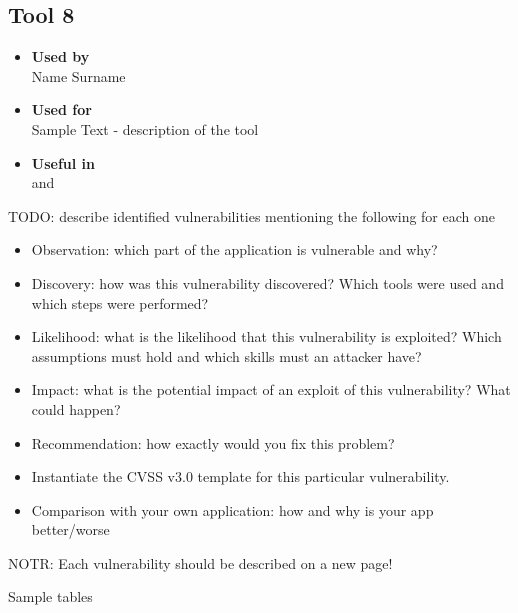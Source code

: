 \subsection*{Tool 8}
\begin{itemize}
	\item \textbf{Used by}\\ Name Surname
	\item \textbf{Used for}\\ Sample Text - description of the tool
	\item \textbf{Useful in}\\  and 
\end{itemize}

\clearpage

TODO:\newline
describe identified vulnerabilities mentioning the following for each one
\begin{itemize}
	\item Observation: which part of the application is vulnerable and why?
	\item Discovery: how was this vulnerability discovered? Which tools were used and which steps were performed?
	\item Likelihood: what is the likelihood that this vulnerability is exploited? Which assumptions must hold and which skills must an attacker have?
	\item Impact: what is the potential impact of an exploit of this vulnerability? What could happen?
	\item Recommendation: how exactly would you fix this problem?
	\item Instantiate the CVSS v3.0 template for this particular vulnerability.
	\item Comparison with your own application: how and why is your app better/worse
\end{itemize}

NOTR: Each vulnerability should be described on a new page!\newline

\clearpage
Sample tables
\clearpage

